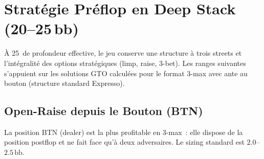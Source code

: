 \documentclass[a4paper,11pt]{article}
\newcommand{\bb}{\,\mathrm{bb}}
\begin{document}
\newpage
\section{Strat\'egie Pr\'eflop en Deep Stack (20--25\,bb)}

\`A 25\bb{} de profondeur effective, le jeu conserve une structure \`a trois streets et l'int\'egralit\'e des options strat\'egiques (limp, raise, 3-bet). Les ranges suivantes s'appuient sur les solutions GTO calcul\'ees pour le format 3-max avec ante au bouton (structure standard Expresso).

\subsection{Open-Raise depuis le Bouton (BTN)}

La position BTN (dealer) est la plus profitable en 3-max~: elle dispose de la position postflop et ne fait face qu'\`a deux adversaires. Le sizing standard est $2.0$--$2.5\bb$.
\end{document}

